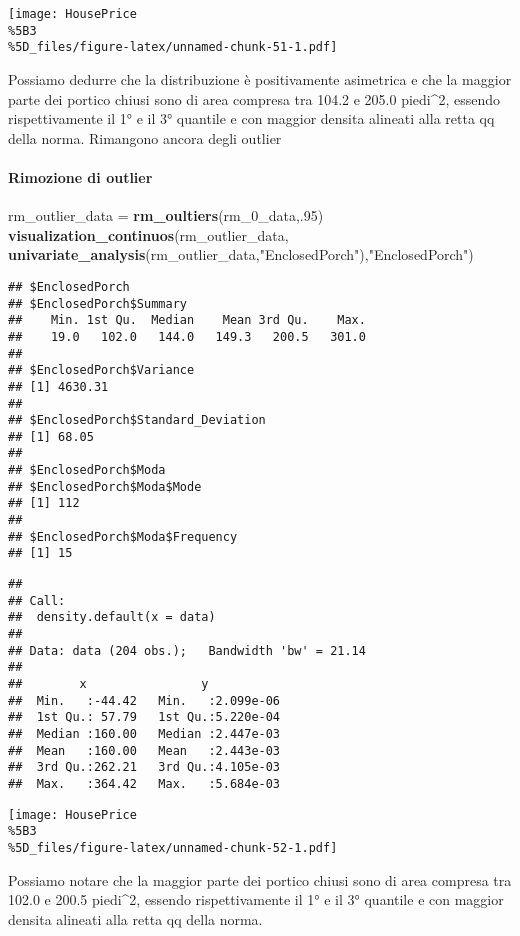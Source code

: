 \documentclass[
]{article}
\newenvironment{Shaded}{\begin{snugshade}}{\end{snugshade}}
\newcommand{\DecValTok}[1]{\textcolor[rgb]{0.00,0.00,0.81}{#1}}
\newcommand{\FunctionTok}[1]{\textcolor[rgb]{0.13,0.29,0.53}{\textbf{#1}}}
\newcommand{\NormalTok}[1]{#1}
\newcommand{\OtherTok}[1]{\textcolor[rgb]{0.56,0.35,0.01}{#1}}
\newcommand{\StringTok}[1]{\textcolor[rgb]{0.31,0.60,0.02}{#1}}
\begin{document}
\texttt{[image: HousePrice\\\%5B3\\\%5D\_files/figure-latex/unnamed-chunk-51-1.pdf]}

Possiamo dedurre che la distribuzione è positivamente asimetrica e che
la maggior parte dei portico chiusi sono di area compresa tra 104.2 e
205.0 piedi\^{}2, essendo rispettivamente il 1° e il 3° quantile e con
maggior densita alineati alla retta qq della norma. Rimangono ancora
degli outlier

\paragraph{Rimozione di outlier}\label{rimozione-di-outlier-12}

\begin{Shaded}
\begin{Highlighting}[]
\NormalTok{rm\_outlier\_data }\OtherTok{=} \FunctionTok{rm\_oultiers}\NormalTok{(rm\_0\_data,.}\DecValTok{95}\NormalTok{)}
\FunctionTok{visualization\_continuos}\NormalTok{(rm\_outlier\_data, }\FunctionTok{univariate\_analysis}\NormalTok{(rm\_outlier\_data,}\StringTok{"EnclosedPorch"}\NormalTok{),}\StringTok{"EnclosedPorch"}\NormalTok{)}
\end{Highlighting}
\end{Shaded}

\begin{verbatim}
## $EnclosedPorch
## $EnclosedPorch$Summary
##    Min. 1st Qu.  Median    Mean 3rd Qu.    Max. 
##    19.0   102.0   144.0   149.3   200.5   301.0 
## 
## $EnclosedPorch$Variance
## [1] 4630.31
## 
## $EnclosedPorch$Standard_Deviation
## [1] 68.05
## 
## $EnclosedPorch$Moda
## $EnclosedPorch$Moda$Mode
## [1] 112
## 
## $EnclosedPorch$Moda$Frequency
## [1] 15
\end{verbatim}

\begin{verbatim}
## 
## Call:
##  density.default(x = data)
## 
## Data: data (204 obs.);   Bandwidth 'bw' = 21.14
## 
##        x                y            
##  Min.   :-44.42   Min.   :2.099e-06  
##  1st Qu.: 57.79   1st Qu.:5.220e-04  
##  Median :160.00   Median :2.447e-03  
##  Mean   :160.00   Mean   :2.443e-03  
##  3rd Qu.:262.21   3rd Qu.:4.105e-03  
##  Max.   :364.42   Max.   :5.684e-03
\end{verbatim}

\texttt{[image: HousePrice\\\%5B3\\\%5D\_files/figure-latex/unnamed-chunk-52-1.pdf]}

Possiamo notare che la maggior parte dei portico chiusi sono di area
compresa tra 102.0 e 200.5 piedi\^{}2, essendo rispettivamente il 1° e
il 3° quantile e con maggior densita alineati alla retta qq della norma.
\end{document}
